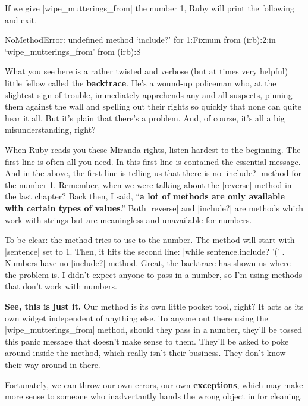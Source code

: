 \documentclass[12pt,twoside]{report}
\begin{document}
If we give \rubyinline|wipe_mutterings_from| the
number 1, Ruby will print the following and exit.


\begin{consolecode}

 NoMethodError: undefined method `include?' for 1:Fixnum
         from (irb):2:in `wipe_mutterings_from'
         from (irb):8

\end{consolecode}


What you see here is a rather twisted and verbose (but at times very
helpful) little fellow called the {\bf backtrace}.  He's a wound-up
policeman who, at the slightest sign of trouble, immediately
apprehends any and all suspects, pinning them against the wall and
spelling out their rights so quickly that none can quite hear it all.
But it's plain that there's a problem.  And, of course, it's all a big
misunderstanding, right?

When Ruby reads you these Miranda rights, listen hardest to the
beginning.  The first line is often all you need.  In this first line
is contained the essential message.  And in the above, the first line
is telling us that there is no \rubyinline|include?|
method for the number 1. Remember, when we were talking about the
\rubyinline|reverse| method in the last chapter?  Back
then, I said, ``{\bf a lot of methods are only available with certain
  types of values}.''  Both \rubyinline|reverse| and
\rubyinline|include?| are methods which work with
strings but are meaningless and unavailable for numbers.

To be clear: the method tries to use to the number.  The method will
start with \rubyinline|sentence| set to 1. Then, it
hits the second line: 
\rubyinline|while sentence.include? '('|.  
Numbers have no \rubyinline|include?| method.  Great,
the backtrace has shown us where the problem is.  I didn't expect
anyone to pass in a number, so I'm using methods that don't work with
numbers.

{\bf See, this is just it.}  Our method is its own little pocket tool,
right?  It acts as its own widget independent of anything else.  To
anyone out there using the
\rubyinline|wipe_mutterings_from| method, should they
pass in a number, they'll be tossed this panic message that doesn't
make sense to them.  They'll be asked to poke around inside the
method, which really isn't their business.  They don't know their way
around in there.

Fortunately, we can throw our own errors, our own {\bf exceptions},
which may make more sense to someone who inadvertantly hands the wrong
object in for cleaning.
\end{document}
